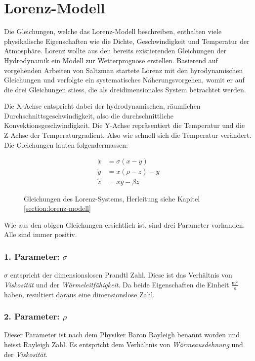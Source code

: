 

\section{Lorenz-Modell}\label{lorenz-modell}

Die Gleichungen, welche das Lorenz-Modell beschreiben, enthalten viele physikalische Eigenschaften wie die Dichte, Geschwindigkeit und Temperatur der Atmosphäre. Lorenz wollte aus den bereits existierenden Gleichungen der Hydrodynamik ein Modell zur Wetterprognose erstellen. Basierend auf vorgehenden Arbeiten von Saltzman \cite{saltzman62} startete Lorenz mit den hyrodynamischen Gleichungen und verfolgte ein systematisches Näherungsvorgehen, womit er auf die drei Gleichungen stiess, die als dreidimensionales System betrachtet werden. 

Die X-Achse entspricht dabei der hydrodynamischen, räumlichen Durchschnittsgeschwindigkeit, also die durchschnittliche Konvektionsgeschwindigkeit. Die Y-Achse repräsentiert die Temperatur und die Z-Achse der Temperaturgradient. Also wie schnell sich die Temperatur verändert. Die Gleichungen lauten folgendermassen:

\begin{figure}
	\begin{align}
		\dot{x} &= \sigma(x - y)\\
		\dot{y} &= x(\rho - z) - y\\
		\dot{z} &= xy - \beta z
	\end{align}
	\caption{Gleichungen des Lorenz-Systems, Herleitung siehe Kapitel \ref{section:lorenz-modell}}
\end{figure}

Wie aus den obigen Gleichungen ersichtlich ist, sind drei Parameter vorhanden. Alle sind immer positiv.

\subsubsection{1. Parameter: $\sigma$}
$\sigma$ entspricht der dimensionslosen Prandtl Zahl. Diese ist das Verhältnis von \textit{Viskosität} und der \textit{Wärmeleitfähigkeit}. Da beide Eigenschaften die Einheit $\frac{\text{m}^2}{\text{s}}$ haben, resultiert daraus eine dimensionslose Zahl.

\subsubsection{2. Parameter: $\rho$}
Dieser Parameter ist nach dem Physiker Baron Rayleigh benannt worden und heisst Rayleigh Zahl. Es entspricht dem Verhältnis von \textit{Wärmeausdehnung} und der \textit{Viskosität}.

